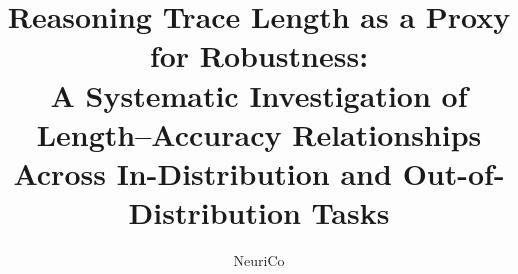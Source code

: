\documentclass{article}
\title{Reasoning Trace Length as a Proxy for Robustness:\\A Systematic Investigation of Length--Accuracy Relationships\\Across In-Distribution and Out-of-Distribution Tasks}
\author{NeuriCo}
\begin{document}
\maketitle

\begin{abstract}

\end{abstract}










\end{document}
